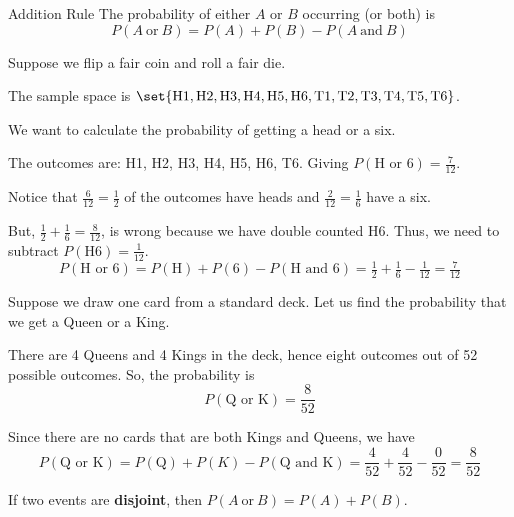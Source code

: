 \documentclass{beamer}
\newcommand{\prob}[1]{P\left(#1\right)}
\begin{document}
\begin{frame}
\begin{block}{Addition Rule}
The probability of either $A$ or $B$ occurring (or both) is
\begin{equation*}
\prob{A~\text{or}~B}=\prob{A}+\prob{B}-\prob{A~\text{and}~B}
\end{equation*}
\end{block}\pause

\begin{example}
Suppose we flip a fair coin and roll a fair die. 

\vspace{2mm}
The sample space is $\set{\text{H1}, \text{H2}, \text{H3}, \text{H4}, \text{H5}, \text{H6}, \text{T1}, \text{T2}, \text{T3}, \text{T4}, \text{T5}, \text{T6}}$.

\vspace{2mm}
We want to calculate the probability of getting a head or a six.\pause

\vspace{2mm} 
The outcomes are: H1, H2, H3, H4, H5, H6, T6. Giving $\prob{\text{H or 6}} = \tfrac{7}{12}$.\pause

\vspace{2mm}
Notice that $\tfrac{6}{12}=\tfrac{1}{2}$ of the outcomes have heads and $\tfrac{2}{12}=\tfrac{1}{6}$ have a six. \pause

\vspace{2mm}
But, $\tfrac{1}{2}+\tfrac{1}{6}=\frac{8}{12}$, is wrong because we have double counted H6. Thus, we need to subtract $\prob{\text{H6}}=\tfrac{1}{12}$.
\begin{equation*}
\prob{\text{H or 6}} = \prob{\text{H}}+\prob{6}-\prob{\text{H and 6}} = \tfrac{1}{2}+\tfrac{1}{6}-\tfrac{1}{12}=\tfrac{7}{12}
\end{equation*}
\end{example}
\end{frame}

\begin{frame}
\begin{example}
Suppose we draw one card from a standard deck. Let us find the probability that we get a Queen or a King.\pause

\vspace{2mm}
There are 4 Queens and 4 Kings in the deck, hence eight outcomes out of 52 possible outcomes. So, the probability is
\begin{equation*}
\prob{\text{Q or K}} = \dfrac{8}{52}
\end{equation*}\pause

Since there are no cards that are both Kings and Queens, we have
\begin{equation*}
\prob{\text{Q or K}} = \prob{\text{Q}} + \prob{K} - \prob{\text{Q and K}} = \dfrac{4}{52}+\dfrac{4}{52}-\dfrac{0}{52} = \dfrac{8}{52}
\end{equation*}
\end{example}\pause

\begin{note}
If two events are \textbf{disjoint}, then $\prob{A~\text{or}~B} = \prob{A}+\prob{B}$.
\end{note}
\end{frame}
\end{document}
